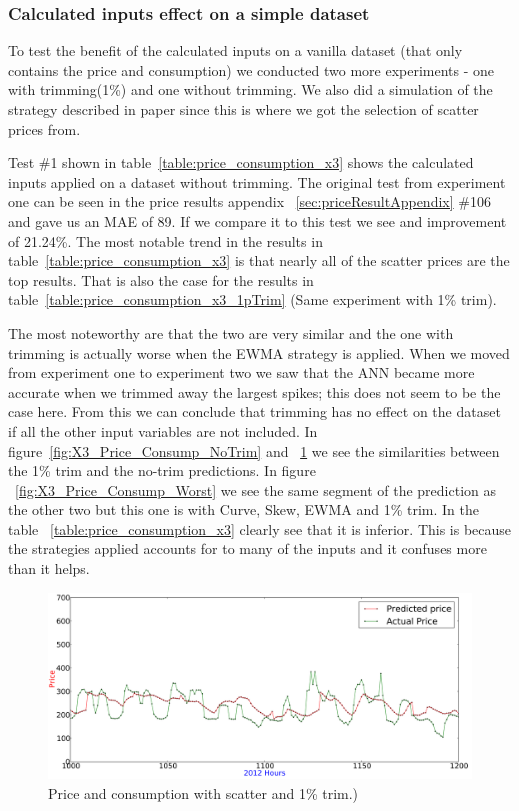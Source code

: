 \subsubsection{Calculated inputs effect on a simple dataset}
To test the benefit of the calculated inputs on a vanilla dataset (that only contains the price and consumption) we conducted two more experiments - one with trimming(1\%) and one without trimming. We also did a simulation of the strategy described in paper \cite{singhal2011electricity} since this is where we got the selection of scatter prices from.

Test \#1 shown in table~\ref{table:price_consumption_x3} shows the calculated inputs applied on a dataset without trimming. The original test from experiment one can be seen in the price results appendix ~\ref{sec:priceResultAppendix} \#106 and gave us an MAE of 89. If we compare it to this test we see and improvement of 21.24\%. The most notable trend in the results in table~\ref{table:price_consumption_x3} is that nearly all of the scatter prices are the top results. That is also the case for the results in table~\ref{table:price_consumption_x3_1pTrim} (Same experiment with 1\% trim).

The most noteworthy are that the two are very similar and the one with trimming is actually worse when the EWMA strategy is applied. When we moved from experiment one to experiment two we saw that the ANN became more accurate when we trimmed away the largest spikes; this does not seem to be the case here. From this we can conclude that trimming has no effect on the dataset if all the other input variables are not included. In figure~\ref{fig:X3_Price_Consump_NoTrim} and ~\ref{fig:X3_Price_Consump_1pTrim} we see the similarities between the 1\% trim and the no-trim predictions. In figure ~\ref{fig:X3_Price_Consump_Worst} we see the same segment of the prediction as the other two but this one is with Curve, Skew, EWMA and 1\% trim. In the table ~\ref{table:price_consumption_x3} clearly see that it is inferior. This is because the strategies applied accounts for to many of the inputs and it confuses more than it helps.

\begin{figure}[H]
\centering
\includegraphics[width=\linewidth]{billeder/PriceExperimentalAnalysis/X3_Price_Consump_1pTrim.png}
\caption{Price and consumption with scatter and 1\% trim.)}
\label{fig:X3_Price_Consump_1pTrim}
\end{figure}

